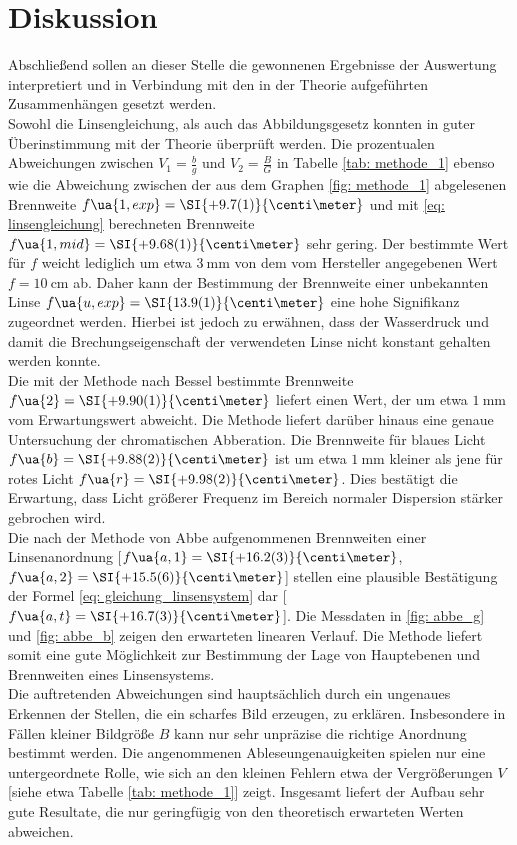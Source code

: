 \section{Diskussion}
Abschließend sollen an dieser Stelle die gewonnenen Ergebnisse der Auswertung interpretiert und
in Verbindung mit den in der Theorie aufgeführten Zusammenhängen gesetzt werden.\\
Sowohl die Linsengleichung, als auch das Abbildungsgesetz konnten in guter Überinstimmung
mit der Theorie überprüft werden. Die prozentualen Abweichungen zwischen $V_1 = \frac{b}{g}$ und $V_2 = \frac{B}{G}$ %
in Tabelle \ref{tab: methode_1} ebenso wie die Abweichung zwischen der aus dem Graphen \ref{fig: methode_1} abgelesenen Brennweite $f\ua{1, exp} = \SI{+9.7(1)}{\centi\meter}$ und mit \eqref{eq: linsengleichung} %
berechneten Brennweite $f\ua{1, mid} = \SI{+9.68(1)}{\centi\meter}$ sehr gering. Der bestimmte Wert für $f$ weicht lediglich um etwa $\SI{3}{\milli\meter}$ von dem vom Hersteller
angegebenen Wert $f = \SI{10}{\centi\meter}$ ab. Daher kann der Bestimmung der Brennweite einer unbekannten Linse $  f\ua{u, exp} = \SI{13.9(1)}{\centi\meter}$
eine hohe Signifikanz zugeordnet werden. Hierbei ist jedoch zu erwähnen, dass der Wasserdruck und damit die Brechungseigenschaft der %
verwendeten Linse nicht konstant gehalten werden konnte. \\ %
Die mit der Methode nach Bessel bestimmte Brennweite $f\ua{2} = \SI{+9.90(1)}{\centi\meter}$ liefert einen Wert, der um etwa $\SI{1}{\milli\meter}$ vom Erwartungswert abweicht. Die Methode
liefert darüber hinaus eine genaue Untersuchung der chromatischen Abberation. Die Brennweite für blaues Licht $f\ua{b} = \SI{+9.88(2)}{\centi\meter}$ ist um etwa
$\SI{1}{\milli\meter}$ kleiner als jene für rotes Licht $f\ua{r} = \SI{+9.98(2)}{\centi\meter}$. Dies bestätigt die Erwartung, dass Licht größerer Frequenz im Bereich %
normaler Dispersion stärker gebrochen wird.\\
Die nach der Methode von Abbe aufgenommenen Brennweiten einer Linsenanordnung [$f\ua{a, 1} = \SI{+16.2(3)}{\centi\meter}$, $f\ua{a, 2} = \SI{+15.5(6)}{\centi\meter}$] stellen eine plausible Bestätigung der Formel
\eqref{eq: gleichung_linsensystem} dar [$f\ua{a, t} = \SI{+16.7(3)}{\centi\meter}$]. Die Messdaten in \ref{fig: abbe_g} und \ref{fig: abbe_b} zeigen den erwarteten linearen Verlauf.
Die Methode liefert somit eine gute Möglichkeit zur Bestimmung der Lage von Hauptebenen und Brennweiten eines Linsensystems.\\
Die auftretenden Abweichungen sind hauptsächlich durch ein ungenaues Erkennen der Stellen, die ein scharfes Bild erzeugen, zu erklären.
Insbesondere in Fällen kleiner Bildgröße $B$ kann nur sehr unpräzise die richtige Anordnung bestimmt werden. Die angenommenen Ableseungenauigkeiten
spielen nur eine untergeordnete Rolle, wie sich an den kleinen Fehlern etwa der Vergrößerungen $V$ [siehe etwa Tabelle \ref{tab: methode_1}] zeigt. %
Insgesamt liefert der Aufbau sehr gute Resultate, die nur geringfügig von den theoretisch erwarteten Werten abweichen. %
